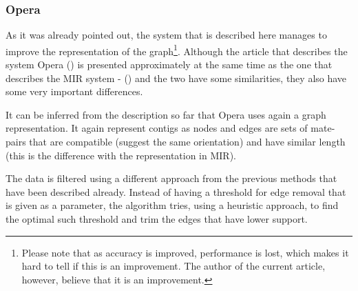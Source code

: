 \documentclass[11pt]{article}
\begin{document}



\subsubsection{Opera} %
\label{ssub:Opera}
As it was already pointed out, the system that is described here manages to
improve the representation of the graph\footnote{Please note that as accuracy is
improved, performance is lost, which makes it hard to tell if this is an
improvement. The author of the current article, however, believe that it is an
improvement.}. Although the article that describes the system Opera
(\cite{Opera}) is presented approximately at the same time as the one that
describes the MIR system - (\cite{MIR}) and the two have some similarities, they
also have some very important differences.

It can be inferred from the description so far that Opera uses again a graph
representation. It again represent contigs as nodes and edges are sets of
mate-pairs that are compatible (suggest the same orientation) and have similar
length (this is the difference with the representation in MIR).

The data is filtered using a different approach from the previous methods that
have been described already. Instead of having a threshold for edge removal
that is given as a parameter, the algorithm tries, using a heuristic approach,
to find the optimal such threshold and trim the edges that have lower support.
\end{document}
